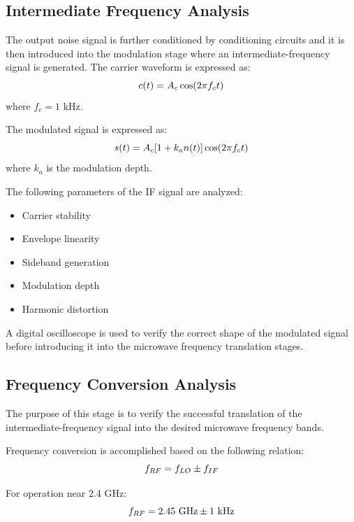 \documentclass[12pt,a4paper]{report}
\begin{document}
	\subsection{Intermediate Frequency Analysis}
	The output noise signal is further conditioned by conditioning circuits and it is then introduced into the modulation stage where an intermediate-frequency signal is generated. The carrier waveform is expressed as:
	\begingroup
	\setlength{\mathindent}{0pt}
	\begin{equation*}
		\hfill
		c(t) = A_c \cos(2\pi f_c t)
		\hfill
	\end{equation*}
	\endgroup
	where $f_c = 1$ kHz.
	
	The modulated signal is expressed as:
	\begingroup
	\setlength{\mathindent}{0pt}
	\begin{equation*}
		\hfill
		s(t) = A_c [1 + k_a n(t)] \cos(2\pi f_c t)
		\hfill
	\end{equation*}
	\endgroup
	where $k_a$ is the modulation depth.
	
	The following parameters of the IF signal are analyzed:
	\begin{itemize}
		\item Carrier stability
		\item Envelope linearity
		\item Sideband generation
		\item Modulation depth
		\item Harmonic distortion
	\end{itemize}
	
	A digital oscilloscope is used to verify the correct shape of the modulated signal before introducing it into the microwave frequency translation stages.
	\subsection{Frequency Conversion Analysis}
	The purpose of this stage is to verify the successful translation of the intermediate-frequency signal into the desired microwave frequency bands.
	
	Frequency conversion is accomplished based on the following relation:
	\begingroup
	\setlength{\mathindent}{0pt}
	\begin{equation*}
		\hfill
		f_{RF} = f_{LO} \pm f_{IF}
		\hfill
	\end{equation*}
	\endgroup
	
	For operation near 2.4 GHz:
	\begingroup
	\setlength{\mathindent}{0pt}
	\begin{equation*}
		\hfill
		f_{RF} = 2.45\ \text{GHz} \pm 1\ \text{kHz}
		\hfill
	\end{equation*}
	\endgroup
	
\end{document}
